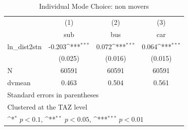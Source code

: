 \begin{table}[htbp]\centering
\def\sym#1{\ifmmode^{#1}\else\(^{#1}\)\fi}
\caption{Individual Mode Choice: non movers}
\begin{tabular}{l*{3}{c}}
\hline\hline
            &\multicolumn{1}{c}{(1)}&\multicolumn{1}{c}{(2)}&\multicolumn{1}{c}{(3)}\\
            &\multicolumn{1}{c}{sub}&\multicolumn{1}{c}{bus}&\multicolumn{1}{c}{car}\\
\hline
ln\_dist2stn & -0.203\sym{***}&  0.072\sym{***}&  0.064\sym{***}\\
            &(0.025)         &(0.016)         &(0.015)         \\
\hline
N           &  60591         &  60591         &  60591         \\
dvmean      &  0.463         &  0.504         &  0.561         \\
\hline\hline
\multicolumn{4}{l}{\footnotesize Standard errors in parentheses}\\
\multicolumn{4}{l}{\footnotesize Clustered at the TAZ level}\\
\multicolumn{4}{l}{\footnotesize \sym{*} \(p<0.1\), \sym{**} \(p<0.05\), \sym{***} \(p<0.01\)}\\
\end{tabular}
\end{table}
